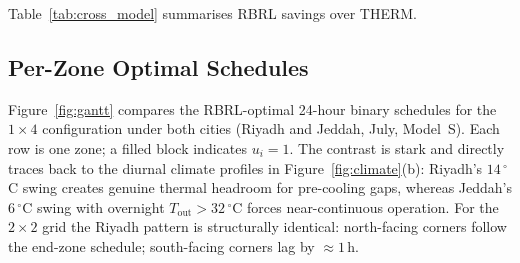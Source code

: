 \documentclass[12pt,a4paper]{article}
\let\oldsubsection\subsection
\renewcommand{\subsection}[1]{\FloatBarrier\oldsubsection{#1}}
\newcommand{\Tout}{T_{\mathrm{out}}}
\begin{document}
Table~\ref{tab:cross_model} summarises RBRL savings over THERM.

\subsection{Per-Zone Optimal Schedules}
\label{subsec:perzone}

Figure~\ref{fig:gantt} compares the RBRL-optimal 24-hour binary schedules
for the $1\!\times\!4$ configuration under both cities (Riyadh and Jeddah,
July, Model~S).
Each row is one zone; a filled block indicates $u_i=1$.
The contrast is stark and directly traces back to the diurnal climate
profiles in Figure~\ref{fig:climate}(b): Riyadh's $14\,^\circ$C swing
creates genuine thermal headroom for pre-cooling gaps, whereas Jeddah's
$6\,^\circ$C swing with overnight $\Tout>32\,^\circ$C forces near-continuous
operation.
For the $2\!\times\!2$ grid the Riyadh pattern is structurally identical:
north-facing corners follow the end-zone schedule; south-facing corners
lag by ${\approx}1\,\text{h}$.
\end{document}
